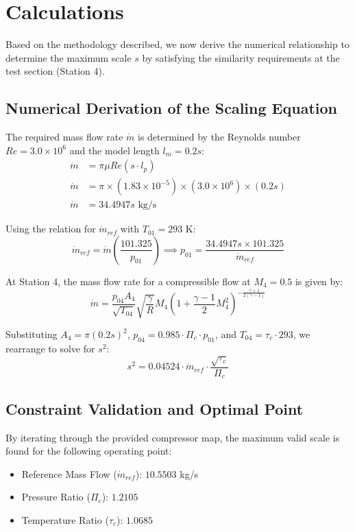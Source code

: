 \documentclass[12pt]{article}
\begin{document}
\newpage
\section{Calculations }

Based on the methodology described, we now derive the numerical relationship to determine the maximum scale $s$ by satisfying the similarity requirements at the test section (Station 4).

\subsection{Numerical Derivation of the Scaling Equation}
The required mass flow rate $\dot{m}$ is determined by the Reynolds number $Re = 3.0 \times 10^6$ and the model length $l_m = 0.2s$:
\begin{align*}
    \dot{m} &= \pi \mu Re (s \cdot l_p) \\
    \dot{m} &= \pi \times (1.83 \times 10^{-5}) \times (3.0 \times 10^6) \times (0.2s) \\
    \dot{m} &= 34.4947s \text{ kg/s}
\end{align*}

Using the relation for $\dot{m}_{ref}$ with $T_{01} = 293$ K:
\begin{equation}
    \dot{m}_{ref} = \dot{m} \left( \frac{101.325}{p_{01}} \right) \implies p_{01} = \frac{34.4947s \times 101.325}{\dot{m}_{ref}}
\end{equation}

At Station 4, the mass flow rate for a compressible flow at $M_4 = 0.5$ is given by:
\begin{equation}
    \dot{m} = \frac{p_{04} A_4}{\sqrt{T_{04}}} \sqrt{\frac{\gamma}{R}} M_4 \left( 1 + \frac{\gamma-1}{2} M_4^2 \right)^{-\frac{\gamma+1}{2(\gamma-1)}}
\end{equation}

Substituting $A_4 = \pi (0.2s)^2$, $p_{04} = 0.985 \cdot \Pi_c \cdot p_{01}$, and $T_{04} = \tau_c \cdot 293$, we rearrange to solve for $s^2$:
\begin{equation}
    s^2 = 0.04524 \cdot \dot{m}_{ref} \cdot \frac{\sqrt{\tau_c}}{\Pi_c}
\end{equation}

\subsection{Constraint Validation and Optimal Point}
By iterating through the provided compressor map, the maximum valid scale is found for the following operating point:
\begin{itemize}
    \item {Reference Mass Flow ($\dot{m}_{ref}$):} $10.5503$ kg/s
    \item {Pressure Ratio ($\Pi_c$):} $1.2105$
    \item {Temperature Ratio ($\tau_c$):} $1.0685$
\end{itemize}
\end{document}
